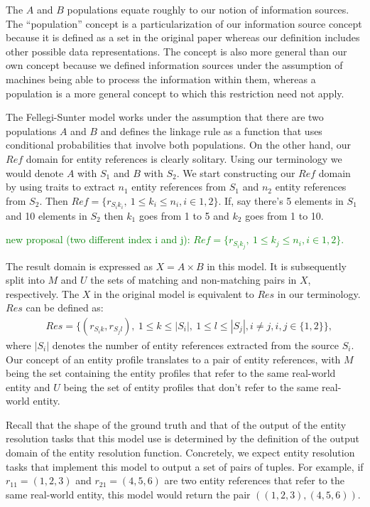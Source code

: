 \documentclass[11pt]{article}
\begin{document}
    The $A$ and $B$ populations equate roughly to our notion of information
    sources.
    The ``population'' concept is a particularization of our information source
    concept because it is defined as a set in the original paper whereas our
    definition includes other possible data representations.
    The concept is also more general than our own concept because we defined
    information sources under the assumption of machines being able to process
    the information within them, whereas a population is a more general concept
    to which this restriction need not apply.

    The Fellegi-Sunter model works under the assumption that there are two
    populations $A$ and $B$ and defines the linkage rule as a function that uses
    conditional probabilities that involve both populations.
    On the other hand, our $Ref$ domain for entity references is clearly
    solitary.
    Using our terminology we would denote $A$ with $S_1$ and $B$ with $S_2$.
    We start constructing our $Ref$ domain by using traits to extract $n_1$
    entity references from $S_1$ and $n_2$ entity references from $S_2$.
    Then $Ref = \{r_{{S_i}{k_i}},~1 \leq k_i \leq n_i, i \in {1, 2} \}$.
    If, say there's 5 elements in $S_1$ and 10 elements in $S_2$ then $k_1$ goes
    from 1 to 5 and $k_2$ goes from 1 to 10.

    \textcolor{green}{new proposal (two different index i and j):  $Ref = \{r_{{S_i}{k_j}},~1 \leq k_j \leq n_i, i \in {1, 2} \}$.}
    
    The result domain is expressed as $X = A \times B$ in this model.
    It is subsequently split into $M$ and $U$ the sets of matching and
    non-matching pairs in $X$, respectively.
    The $X$ in the original model is equivalent to $Res$ in our terminology.
    $Res$ can be defined as:
    \begin{align}
        &Res = \{(r_{{S_i}{k}}, r_{{S_j}{l}}),~1 \leq k \leq |S_i|,~1
        \leq l \leq |S_j|, i \neq j, i,j \in \{1, 2\}\}\textrm{,}\nonumber
    \end{align}
    where $|S_i|$ denotes the number of entity references extracted from the
    source $S_i$.
    Our concept of an entity profile translates to a pair of entity references,
    with $M$ being the set containing the entity profiles that refer to the same
    real-world entity and $U$ being the set of entity profiles that don't refer
    to the same real-world entity.

    Recall that the shape of the ground truth and that of the output of the
    entity resolution tasks that this model use is determined by the definition
    of the output domain of the entity resolution function.
    Concretely, we expect entity resolution tasks that implement this model to
    output a set of pairs of tuples.
    For example, if $r_{11}=(1, 2, 3)$ and $r_{21}=(4, 5, 6)$ are two entity
    references that refer to the same real-world entity, this model would return
    the pair $((1, 2, 3), (4, 5, 6))$.
\end{document}
